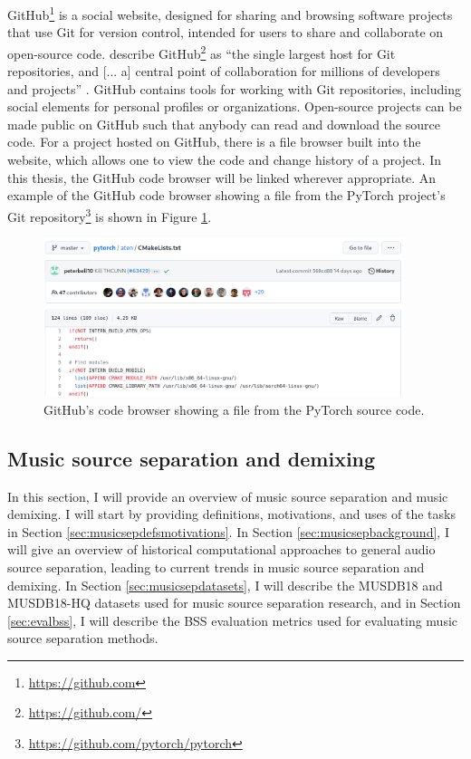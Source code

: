 \documentclass[report.tex]{subfiles}
\begin{document}
GitHub\footnote{\url{https://github.com}} is a social website, designed for sharing and browsing software projects that use Git for version control, intended for users to share and collaborate on open-source code. \citeauthor{gitbook} describe GitHub\footnote{\url{https://github.com/}} as ``the single largest host for Git repositories, and [... a] central point of collaboration for millions of developers and projects'' \parencite[131]{gitbook}. GitHub contains tools for working with Git repositories, including social elements for personal profiles or organizations. Open-source projects can be made public on GitHub such that anybody can read and download the source code. For a project hosted on GitHub, there is a file browser built into the website, which allows one to view the code and change history of a project. In this thesis, the GitHub code browser will be linked wherever appropriate. An example of the GitHub code browser showing a file from the PyTorch project's Git repository\footnote{\url{https://github.com/pytorch/pytorch}} is shown in Figure \ref{fig:githubpytorch}.

\begin{figure}[ht]
	\centering
	\includegraphics[width=0.9375\textwidth]{./images-misc/github.png}
	\caption{GitHub's code browser showing a file from the PyTorch source code.}
	\label{fig:githubpytorch}
\end{figure}

\newpagefill

\subsection{Music source separation and demixing}
\label{sec:musicsep}

In this section, I will provide an overview of music source separation and music demixing. I will start by providing definitions, motivations, and uses of the tasks in Section \ref{sec:musicsepdefsmotivations}. In Section \ref{sec:musicsepbackground}, I will give an overview of historical computational approaches to general audio source separation, leading to current trends in music source separation and demixing. In Section \ref{sec:musicsepdatasets}, I will describe the MUSDB18 and MUSDB18-HQ datasets used for music source separation research, and in Section \ref{sec:evalbss}, I will describe the BSS evaluation metrics used for evaluating music source separation methods.
\end{document}
